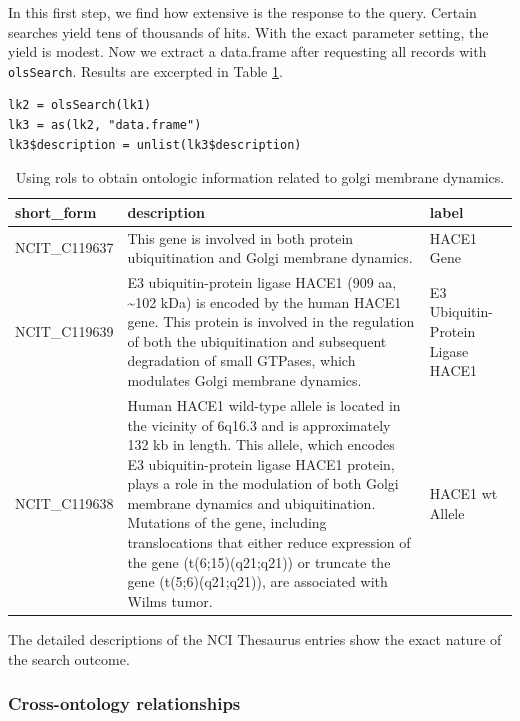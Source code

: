 \documentclass[graybox]{svmult}
\begin{document}
In this first step, we find how extensive is the response
to the query. Certain searches yield tens of thousands of hits.
With the exact parameter setting, the yield is modest.
Now we extract a data.frame after requesting all
records with \texttt{olsSearch}.  Results are
excerpted in Table \ref{tab:tab-golg}.

\begin{shaded}
\begin{verbatim}
lk2 = olsSearch(lk1)
lk3 = as(lk2, "data.frame")
lk3$description = unlist(lk3$description)
\end{verbatim}
\end{shaded}



\begin{table}
\caption{Using rols to obtain ontologic information related to
golgi membrane dynamics. \label{tab:tab-golg}}
\begin{tabular}{lp{5cm}p{8cm}}
\toprule
short\_form & description & label\\
\midrule
NCIT\_C119637 & This gene is involved in both protein ubiquitination and Golgi membrane dynamics. & HACE1 Gene\\
NCIT\_C119639 & E3 ubiquitin-protein ligase HACE1 (909 aa, \textasciitilde{}102 kDa) is encoded by the human HACE1 gene. This protein is involved in the regulation of both the ubiquitination and subsequent degradation of small GTPases, which modulates Golgi membrane dynamics. & E3 Ubiquitin-Protein Ligase HACE1\\
NCIT\_C119638 & Human HACE1 wild-type allele is located in the vicinity of 6q16.3 and is approximately 132 kb in length. This allele, which encodes E3 ubiquitin-protein ligase HACE1 protein, plays a role in the modulation of both Golgi membrane dynamics and ubiquitination. Mutations of the gene, including translocations that either reduce expression of the gene (t(6;15)(q21;q21)) or truncate the gene (t(5;6)(q21;q21)), are associated with Wilms tumor. & HACE1 wt Allele\\
\bottomrule
\end{tabular}
\end{table}

The detailed descriptions of the NCI Thesaurus entries show
the exact nature of the search outcome.

\subsubsection{Cross-ontology relationships}\label{cross-ontology-relationships}
\end{document}
